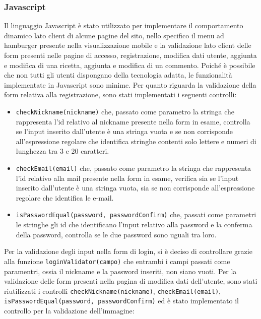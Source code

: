 \subsubsection{Javascript}\label{subs:javascript}
Il linguaggio Javascript è stato utilizzato per implementare il comportamento dinamico lato client di alcune pagine del sito, nello specifico il menu ad hamburger presente nella visualizzazione mobile e la validazione lato client delle form presenti nelle pagine di accesso, registrazione, modifica dati utente, aggiunta e modifica di una ricetta, aggiunta e modifica di un commento.
Poiché è possibile che non tutti gli utenti dispongano della tecnologia adatta, le funzionalità implementate in Javascript sono minime. \newline
Per quanto riguarda la validazione della form relativa alla registrazione, sono stati implementati i seguenti controlli:
\begin{itemize}
	\item \texttt{checkNickname(nickname)} che, passato come parametro la stringa che rappresenta l'id relativo al nickname presente nella form in esame, controlla se l'input inserito dall'utente è una stringa vuota e se non corrisponde all'espressione regolare che identifica stringhe contenti solo lettere e numeri di lunghezza tra 3 e 20 caratteri.
	\item \texttt{checkEmail(email)} che, passato come parametro la stringa che rappresenta l'id relativo alla mail presente nella form in esame, verifica sia se l'input inserito dall'utente è una stringa vuota, sia se non corrisponde all'espressione regolare che identifica le e-mail.
	\item \texttt{isPasswordEqual(password, passwordConfirm)} che, passati come parametri le stringhe gli id che identificano l'input relativo alla password e la conferma della password, controlla se le due password sono uguali tra loro.
\end{itemize}
Per la validazione degli input nella form di login, si è deciso di controllare grazie alla funzione \texttt{loginValidator(campo)} che entrambi i campi passati come paramentri, ossia il nickname e la password inseriti, non siano vuoti. \newline
Per la validazione delle form presenti nella pagina di modifica dati dell'utente, sono stati riutilizzati i controlli \texttt{checkNickname(nickname)}, \texttt{checkEmail(email)}, \texttt{isPasswordEqual(password, passwordConfirm)} ed è stato implementato il controllo per la validazione dell'immagine:
